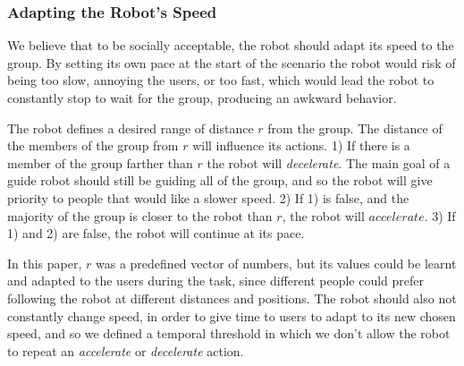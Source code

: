 \vspace{-5pt}
\subsubsection{Adapting the Robot's Speed}
We believe that to be socially acceptable, the robot should adapt its speed to the group. By setting its own pace at the start of the scenario the robot  would risk of being too slow, annoying the users, or too fast, which would lead the robot to constantly stop to wait for the group, producing an awkward behavior.

The robot defines a desired range of distance $r$ from the group. The distance of the  members of the group from $r$ will influence its actions. 1) If there is a member of the group farther than $r$ the robot will \textit{decelerate}. The main goal of a guide robot should still be guiding all of the group, and so the robot will give priority to people that would like a slower speed. 2) If 1) is false, and the majority of the group is closer to the robot than $r$, the robot will $accelerate$. 3) If 1) and 2) are false, the robot will continue at its pace.




In this paper, $r$ was a predefined vector of numbers, but its values could be learnt and adapted to the users during the task, since different people could prefer following the robot at different distances and positions.
The robot should also not constantly change speed, in order to give time to users to adapt to its new chosen speed, and so we defined a temporal threshold in which we don't allow the robot to repeat an \textit{accelerate} or \textit{decelerate} action.

